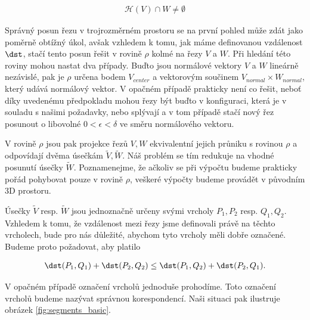 \begin{align} \label{cond:halfspace}
    \mathcal{H}(V) \cap W \neq \emptyset
\end{align}

Správný posun řezu v trojrozměrném prostoru se na první pohled může zdát jako
poměrně obtížný úkol, avšak vzhledem k tomu, jak máme definovanou vzdálenost $ \dst $,
stačí tento posun řešit v rovině $ \rho $ kolmé na řezy $ V $ a $ W $. Při hledání této
roviny mohou nastat dva případy. Buďto jsou normálové vektory $ V $ a $ W $ lineárně
nezávislé, pak je $ \rho $ určena bodem $ V_{center} $ a vektorovým součinem
$ V_{normal} \times W_{normal} $, který udává normálový vektor. V opačném případě
prakticky není co řešit, neboť díky uvedenému předpokladu mohou řezy být buďto
v konfiguraci, která je v souladu s našimi požadavky, nebo splývají a v tom
případě stačí nový řez posunout o libovolné $ 0 < \epsilon < \delta $ ve směru
normálového vektoru.

V rovině $ \rho $ jsou pak projekce řezů $ V, W $ ekvivalentní jejich průniku
s rovinou $ \rho $ a odpovídají dvěma úsečkám $ \widetilde{V}, \widetilde{W} $.
Náš problém se tím redukuje na vhodné posunutí úsečky $ \widetilde{W} $.
Poznamenejme, že ačkoliv se při výpočtu budeme prakticky pořád pohybovat pouze
v rovině $ \rho $, veškeré výpočty budeme provádět v původním 3D prostoru.

Úsečky $ \widetilde{V} $ resp.
$ \widetilde{W} $ jsou jednoznačně určeny svými vrcholy $ P_1, P_2 $ resp. $ Q_1, Q_2 $.
Vzhledem k tomu, že vzdálenost mezi řezy jsme definovali právě na těchto vrcholech,
bude pro nás důležité, abychom tyto vrcholy měli dobře označené. Budeme proto
požadovat, aby platilo

\begin{align*}
    \dst(P_1, Q_1) + \dst(P_2, Q_2) \leq \dst(P_1, Q_2) + \dst(P_2, Q_1).
\end{align*}

V opačném případě označení vrcholů jednoduše prohodíme. Toto označení vrcholů
budeme nazývat správnou korespondencí. Naši situaci pak ilustruje obrázek
\ref{fig:segments_basic}.

